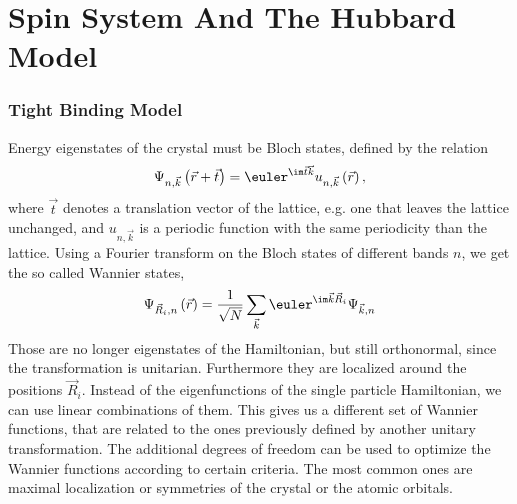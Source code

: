 \documentclass[a4paper,10pt]{report}
\begin{document}

\section{Spin System And The Hubbard Model}

\subsubsection{Tight Binding Model} %




Energy eigenstates of the crystal must be Bloch states, defined by  the relation
\begin{equation}
 \Psi_{n,\vec{k}} \left( \vec{r}+\vec{t}\right) = \euler^{\im \vec{t} \vec{k} } u_{n,\vec{k}} \left( \vec{r} \right), \label{BlochDef}
\end{equation}
where $\vec{t}$ denotes a translation vector of the lattice, e.g. one that leaves the lattice unchanged, 
and $u_{n,\vec{k}}$ is a periodic function with the same periodicity than the lattice.
Using a Fourier transform on the Bloch states of different bands $n$, we get the so called Wannier states,
\begin{equation}
 \Psi_{\vec{R}_i, n} \left( \vec{r} \right) = \frac1{\sqrt{N}} \sum_{\vec{k}} \euler^{\im \vec{k}\vec{R}_i } \Psi_{\vec{k}, n} 
\end{equation}
Those are no longer eigenstates of the Hamiltonian, but still orthonormal, since the transformation is unitarian. 
Furthermore they are localized around the positions $\vec{R}_i$.
Instead of the eigenfunctions of the single particle Hamiltonian, we can use linear combinations of them. 
This gives us a different set of Wannier functions, that are related to the ones previously defined by another unitary transformation.
The additional degrees of freedom can be used to optimize the Wannier functions according to certain criteria.
The most common ones are maximal localization or symmetries of the crystal or the atomic orbitals.
\end{document}
